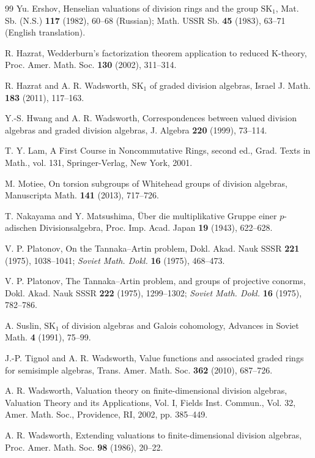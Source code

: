 \documentclass{amsart}
\theoremstyle{definition}
\numberwithin{equation}{section} %
\begin{document}
\begin{thebibliography}{99}
	Yu. Ershov, Henselian valuations of division rings and the group $\mathrm{SK}_1$, Mat. Sb. (N.S.) \textbf{117} (1982), 60--68 (Russian); Math. USSR Sb. \textbf{45} (1983), 63--71 (English translation).
	
	R. Hazrat, Wedderburn's  factorization theorem application to reduced K-theory, Proc. Amer. Math. Soc. \textbf{130} (2002), 311--314.
	
	R. Hazrat and A. R. Wadsworth, $\mathrm{SK}_1$ of graded division algebras, Israel J. Math. \textbf{183} (2011), 117--163.
	
	Y.-S. Hwang and A. R. Wadsworth, Correspondences between valued division algebras and graded division algebras, J. Algebra \textbf{220} (1999), 73--114.
	
	T. Y. Lam, A First Course in Noncommutative Rings, second ed., Grad. Texts in Math., vol. 131, Springer-Verlag, New York, 2001.
	
	M. Motiee, On torsion subgroups of Whitehead groups of division algebras, Manuscripta Math. \textbf{141} (2013), 717--726.
	
	T. Nakayama and Y. Matsushima, \"Uber die multiplikative Gruppe einer $p$-adischen Divisionsalgebra, Proc. Imp. Acad. Japan \textbf{19} (1943), 622--628.
	
	V. P. Platonov, On the Tannaka--Artin problem, Dokl. Akad. Nauk SSSR \textbf{221} (1975), 1038--1041; \textit{Soviet Math. Dokl.} \textbf{16} (1975), 468--473.
	
	V. P. Platonov, The Tannaka--Artin problem, and groups of projective conorms, Dokl. Akad. Nauk SSSR \textbf{222} (1975), 1299--1302; \textit{Soviet Math. Dokl.} \textbf{16} (1975), 782--786.
	
	A. Suslin, $\mathrm{SK}_1$ of division algebras and Galois cohomology, Advances in Soviet Math. \textbf{4} (1991), 75--99.
	
	J.-P. Tignol and A. R. Wadsworth, Value functions and associated graded rings for semisimple algebras, Trans. Amer. Math. Soc. \textbf{362} (2010), 687--726.
	
	A. R. Wadsworth, Valuation theory on finite-dimensional division algebras, Valuation Theory and its Applications, Vol. I, Fields Inst. Commun., Vol. 32, Amer. Math. Soc., Providence, RI, 2002, pp. 385--449.
	
	A. R. Wadsworth, Extending valuations to finite-dimensional division algebras, Proc. Amer. Math. Soc. \textbf{98} (1986), 20--22.
\end{thebibliography}
\end{document}
